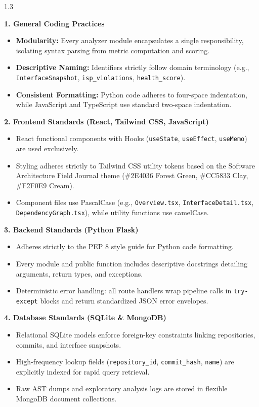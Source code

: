 \documentclass[12pt,a4paper]{article}
\begin{document}
\begin{spacing}{1.3}
\justifying

\textbf{1. General Coding Practices}
\begin{itemize}[leftmargin=*,itemsep=3pt,topsep=3pt]
    \item \textbf{Modularity:} Every analyzer module encapsulates a single responsibility, isolating syntax parsing from metric computation and scoring.
    \item \textbf{Descriptive Naming:} Identifiers strictly follow domain terminology (e.g., \texttt{InterfaceSnapshot}, \texttt{isp\_violations}, \texttt{health\_score}).
    \item \textbf{Consistent Formatting:} Python code adheres to four-space indentation, while JavaScript and TypeScript use standard two-space indentation.
\end{itemize}

\textbf{2. Frontend Standards (React, Tailwind CSS, JavaScript)}
\begin{itemize}[leftmargin=*,itemsep=3pt,topsep=3pt]
    \item React functional components with Hooks (\texttt{useState}, \texttt{useEffect}, \texttt{useMemo}) are used exclusively.
    \item Styling adheres strictly to Tailwind CSS utility tokens based on the Software Architecture Field Journal theme (\#2E4036 Forest Green, \#CC5833 Clay, \#F2F0E9 Cream).
    \item Component files use PascalCase (e.g., \texttt{Overview.tsx}, \texttt{InterfaceDetail.tsx}, \texttt{DependencyGraph.tsx}), while utility functions use camelCase.
\end{itemize}

\textbf{3. Backend Standards (Python Flask)}
\begin{itemize}[leftmargin=*,itemsep=3pt,topsep=3pt]
    \item Adheres strictly to the PEP 8 style guide for Python code formatting.
    \item Every module and public function includes descriptive docstrings detailing arguments, return types, and exceptions.
    \item Deterministic error handling: all route handlers wrap pipeline calls in \texttt{try-except} blocks and return standardized JSON error envelopes.
\end{itemize}

\textbf{4. Database Standards (SQLite \& MongoDB)}
\begin{itemize}[leftmargin=*,itemsep=3pt,topsep=3pt]
    \item Relational SQLite models enforce foreign-key constraints linking repositories, commits, and interface snapshots.
    \item High-frequency lookup fields (\texttt{repository\_id}, \texttt{commit\_hash}, \texttt{name}) are explicitly indexed for rapid query retrieval.
    \item Raw AST dumps and exploratory analysis logs are stored in flexible MongoDB document collections.
\end{itemize}


\end{spacing}
\end{document}
